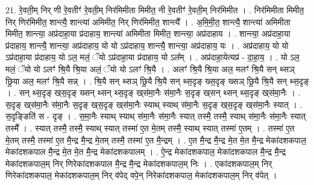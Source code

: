 \documentclass[17pt]{extarticle}
\begin{document}
21. रे॒वती॒म् निर् णी रे॒वतीꣳ॑ रे॒वती॒म् निर॑मिमीता मिमीत॒ नी रे॒वतीꣳ॑ रे॒वती॒म् निर॑मिमीत । . निर॑मिमीता मिमीत॒ निर् णिर॑मिमीत॒ शान्त्यै॒ शान्त्या॑ अमिमीत॒ निर् णिर॑मिमीत॒ शान्त्यै᳚ । . अ॒मि॒मी॒त॒ शान्त्यै॒ शान्त्या॑ अमिमीता मिमीत॒ शान्त्या॒ अप्र॑दाहा॒या प्र॑दाहाय॒ शान्त्या॑ अमिमीता मिमीत॒ शान्त्या॒ अप्र॑दाहाय । . शान्त्या॒ अप्र॑दाहा॒या प्र॑दाहाय॒ शान्त्यै॒ शान्त्या॒ अप्र॑दाहाय॒ यो यो ऽप्र॑दाहाय॒ शान्त्यै॒ शान्त्या॒ अप्र॑दाहाय॒ यः । . अप्र॑दाहाय॒ यो यो ऽप्र॑दाहा॒या प्र॑दाहाय॒ यो ऽल॒ मलं॒ ॅयो ऽप्र॑दाहा॒या प्र॑दाहाय॒ यो ऽल᳚म् । . अप्र॑दाहा॒येत्यप्र॑ - दा॒हा॒य॒ । . यो ऽल॒ मलं॒ ॅयो यो ऽलꣳ॑ श्रि॒यै श्रि॒या अलं॒ ॅयो यो ऽलꣳ॑ श्रि॒यै । . अलꣳ॑ श्रि॒यै श्रि॒या अल॒ मलꣳ॑ श्रि॒यै सन् थ्सञ् छ्रि॒या अल॒ मलꣳ॑ श्रि॒यै सन्न् । . श्रि॒यै सन् थ्सञ् छ्रि॒यै श्रि॒यै सन् थ्स॒दृङ् ख्‍स॒दृङ् ख्‍सञ् छ्रि॒यै श्रि॒यै सन् थ्स॒दृङ् । . सन् थ्स॒दृङ् ख्‌स॒दृङ् ख्‍सन् थ्सन् थ्स॒दृङ् ख्‌स॑मा॒नैः स॑मा॒नैः स॒दृङ् ख्‌सन् थ्सन् थ्स॒दृङ् ख्‌स॑मा॒नैः । . स॒दृङ् ख्‌स॑मा॒नैः स॑मा॒नैः स॒दृङ् ख्‌स॒दृङ् ख्‌स॑मा॒नैः स्याथ् स्याथ् स॑मा॒नैः स॒दृङ् ख्‌स॒दृङ् ख्‌स॑मा॒नैः स्यात् । . स॒दृङ्ङिति॑ स - दृङ् । . स॒मा॒नैः स्याथ् स्याथ् स॑मा॒नैः स॑मा॒नैः स्यात् तस्मै॒ तस्मै॒ स्याथ् स॑मा॒नैः स॑मा॒नैः स्यात् तस्मै᳚ । . स्यात् तस्मै॒ तस्मै॒ स्याथ् स्यात् तस्मा॑ ए॒त मे॒तम् तस्मै॒ स्याथ् स्यात् तस्मा॑ ए॒तम् । . तस्मा॑ ए॒त मे॒तम् तस्मै॒ तस्मा॑ ए॒त मै॒न्द्र मै॒न्द्र मे॒तम् तस्मै॒ तस्मा॑ ए॒त मै॒न्द्रम् । . ए॒त मै॒न्द्र मै॒न्द्र मे॒त मे॒त मै॒न्द्र मेका॑दशकपाल॒ मेका॑दशकपाल मै॒न्द्र मे॒त मे॒त मै॒न्द्र मेका॑दशकपालम् । . ऐ॒न्द्र मेका॑दशकपाल॒ मेका॑दशकपाल मै॒न्द्र मै॒न्द्र मेका॑दशकपाल॒म् निर् णिरेका॑दशकपाल मै॒न्द्र मै॒न्द्र मेका॑दशकपाल॒म् निः । . एका॑दशकपाल॒म् निर् णिरेका॑दशकपाल॒ मेका॑दशकपाल॒म् निर् व॑पेद् वपे॒न् निरेका॑दशकपाल॒ मेका॑दशकपाल॒म् निर् व॑पेत् । \newline
\end{document}
